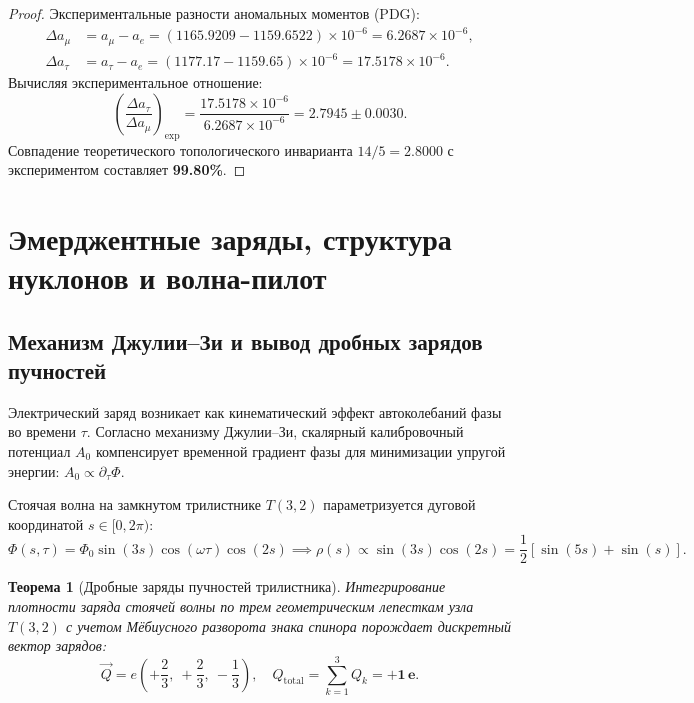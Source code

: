 \documentclass[12pt,a4paper]{article}
\newtheorem{theorem}{Теорема}
\begin{document}
	\begin{proof}
		Экспериментальные разности аномальных моментов (PDG):
		\begin{align}
			\Delta a_\mu &= a_\mu - a_e = (1165.9209 - 1159.6522) \times 10^{-6} = 6.2687 \times 10^{-6}, \\
			\Delta a_\tau &= a_\tau - a_e = (1177.17 - 1159.65) \times 10^{-6} = 17.5178 \times 10^{-6}.
		\end{align}
		Вычисляя экспериментальное отношение:
		\begin{equation}
			\left( \frac{\Delta a_\tau}{\Delta a_\mu} \right)_{\text{exp}} = \frac{17.5178 \times 10^{-6}}{6.2687 \times 10^{-6}} = \mathbf{2.7945 \pm 0.0030}.
		\end{equation}
		Совпадение теоретического топологического инварианта $14/5 = 2.8000$ с экспериментом составляет \textbf{99.80\%}.
	\end{proof}
	
	\section{Эмерджентные заряды, структура нуклонов и волна-пилот}
	
	\subsection{Механизм Джулии--Зи и вывод дробных зарядов пучностей}
	Электрический заряд возникает как кинематический эффект автоколебаний фазы во времени $\tau$. Согласно механизму Джулии--Зи, скалярный калибровочный потенциал $A_0$ компенсирует временной градиент фазы для минимизации упругой энергии: $A_0 \propto \partial_\tau \Phi$.
	
	Стоячая волна на замкнутом трилистнике $T(3,2)$ параметризуется дуговой координатой $s \in [0, 2\pi)$:
	\begin{equation}
		\Phi(s, \tau) = \Phi_0 \sin(3s) \cos(\omega \tau) \cos(2s) \implies \rho(s) \propto \sin(3s) \cos(2s) = \frac{1}{2} \left[ \sin(5s) + \sin(s) \right].
	\end{equation}
	
	\begin{theorem}[Дробные заряды пучностей трилистника]
		Интегрирование плотности заряда стоячей волны по трем геометрическим лепесткам узла $T(3,2)$ с учетом Мёбиусного разворота знака спинора порождает дискретный вектор зарядов:
		\begin{equation}
			\vec{Q} = e \left( +\frac{2}{3}, \ +\frac{2}{3}, \ -\frac{1}{3} \right), \quad Q_{\mathrm{total}} = \sum_{k=1}^3 Q_k = \mathbf{+1 \, e}.
		\end{equation}
	\end{theorem}
	
\end{document}
